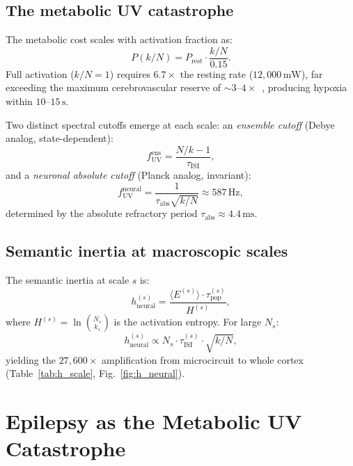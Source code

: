 \documentclass[aps,pre,twocolumn,showpacs,superscriptaddress,longbibliography]{revtex4-2}
\newcommand{\kN}{k/N}
\newcommand{\taupop}{\tau_{\mathrm{pop}}}
\newcommand{\tauISI}{\tau_{\mathrm{ISI}}}
\newcommand{\tauabs}{\tau_{\mathrm{abs}}}
\newcommand{\hneu}{h_{\mathrm{neural}}}
\newcommand{\fUV}{f_{\mathrm{UV}}}
\begin{document}
\subsection{The metabolic UV catastrophe}

The metabolic cost scales with activation fraction as:
\begin{equation}
  P(\kN) = P_{\mathrm{rest}} \cdot \frac{\kN}{0.15}.
  \label{eq:power}
\end{equation}
Full activation ($\kN = 1$) requires $6.7\times$ the resting
rate ($12{,}000\,\mathrm{mW}$), far exceeding the maximum
cerebrovascular reserve of $\sim 3$--$4\times$~\cite{Buzsaki2007},
producing hypoxia within $10$--$15\,\mathrm{s}$.

Two distinct spectral cutoffs emerge at each scale: an
\emph{ensemble cutoff} (Debye analog, state-dependent):
\begin{equation}
  \fUV^{\mathrm{ens}} = \frac{N/k - 1}{\tauISI},
  \label{eq:fUV_ens}
\end{equation}
and a \emph{neuronal absolute cutoff} (Planck analog, invariant):
\begin{equation}
  \fUV^{\mathrm{neural}} = \frac{1}{\tauabs\sqrt{\kN}}
  \approx 587\,\mathrm{Hz},
  \label{eq:fUV_neural}
\end{equation}
determined by the absolute refractory period
$\tauabs \approx 4.4\,\mathrm{ms}$.

\subsection{Semantic inertia at macroscopic scales}

The semantic inertia at scale $s$ is:
\begin{equation}
  \hneu^{(s)} = \frac{\langle E^{(s)}\rangle \cdot \taupop^{(s)}}
                      {H^{(s)}},
  \label{eq:h_scale}
\end{equation}
where $H^{(s)} = \ln\binom{N_s}{k_s}$ is the activation entropy.
For large $N_s$:
\begin{equation}
  \hneu^{(s)} \propto N_s \cdot \tauISI^{(s)} \cdot \sqrt{\kN},
  \label{eq:h_asymp}
\end{equation}
yielding the $27{,}600\times$ amplification from microcircuit
to whole cortex (Table~\ref{tab:h_scale}, Fig.~\ref{fig:h_neural}).

\section{\label{sec:epilepsy}Epilepsy as the Metabolic
         UV Catastrophe}
\end{document}
